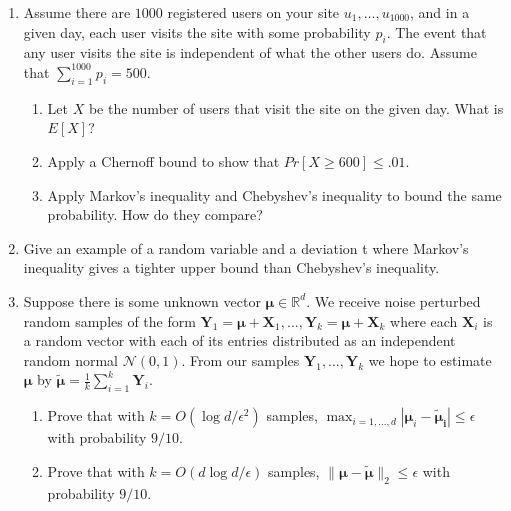 \documentclass[10pt]{article}
\newcommand{\bs}[1]{\boldsymbol{#1}}
\newcommand{\bv}[1]{\mathbf{#1}}
\newcommand{\R}{\mathbb{R}}
\begin{document}
\begin{enumerate}
		\item Assume there are $1000$ registered users on your site $u_1, \ldots, u_{1000}$, and in a given day, each user
		visits the site with some probability $p_i$. The event that any user visits the site is independent of what the other users do. Assume that $\sum_{i=1}^{1000} p_i = 500$. 
		\begin{enumerate}
			\item  Let $X$ be the number of users that visit the site on the given day. What is $E[X]$?
			\item Apply a Chernoff bound to show that $Pr[X \geq 600] \leq .01$.
			\item Apply Markov’s inequality and Chebyshev’s inequality to bound the same probability.
			How do they compare?
		\end{enumerate}
		\item Give an example of a random variable and a deviation t where Markov’s inequality gives a	tighter upper bound than Chebyshev’s inequality.

		\item Suppose there is some unknown vector $\bs{\mu} \in \R^d$. We receive noise perturbed random samples of the form $\bv{Y}_1 = \bs{\mu} + \bv{X}_1, \ldots, \bv{Y}_k = \bs{\mu} + \bv{X}_k$ where each $\bv{X}_i$ is a random vector with each of its entries distributed as an independent random normal $\mathcal{N}(0,1)$. From our samples $\bv{Y}_1, \ldots, \bv{Y}_k$ we hope to estimate $\bs{\mu}$ by $\bs{\tilde{\mu}} = \frac{1}{k}\sum_{i=1}^k \bv{Y}_i$. 
		\begin{enumerate}
			\item Prove that with $k = O(\log d /\epsilon^2)$ samples, $\max_{i=1,\ldots, d}|\bs{\mu}_i -\bs{\tilde{\mu}_i} | \leq \epsilon$ with probability $9/10$.
			\item Prove that with $k = O(d\log d /\epsilon)$ samples, $\|\bs{\mu} -\bs{\tilde{\mu}}\|_2 \leq \epsilon$ with probability $9/10$.
		\end{enumerate}


\end{enumerate}
\end{document}
